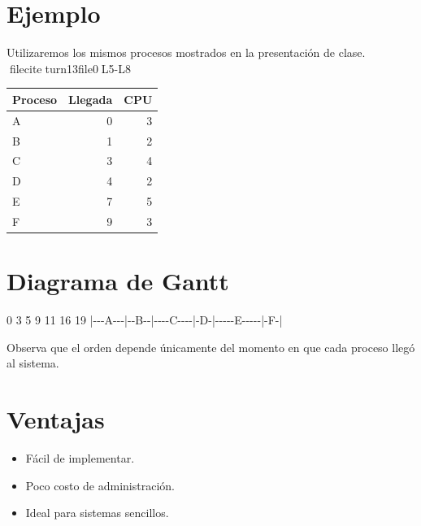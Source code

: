 \documentclass[
  spanish,
  letterpaper,
]{scrbook}
\newenvironment{Shaded}{\begin{snugshade}}{\end{snugshade}}
\newcommand{\NormalTok}[1]{\textcolor[rgb]{0.00,0.23,0.31}{#1}}
\newcounter{none} %
\providecommand{\tightlist}{%
  \setlength{\itemsep}{0pt}\setlength{\parskip}{0pt}}
\begin{document}

\chapter{Ejemplo}\label{ejemplo-1}

Utilizaremos los mismos procesos mostrados en la presentación de clase.
fileciteturn13file0L5-L8

{\def\LTcaptype{none} %
\begin{longtable}[]{@{}lrr@{}}
\toprule\noalign{}
Proceso & Llegada & CPU \\
\midrule\noalign{}
\endhead
\bottomrule\noalign{}
\endlastfoot
A & 0 & 3 \\
B & 1 & 2 \\
C & 3 & 4 \\
D & 4 & 2 \\
E & 7 & 5 \\
F & 9 & 3 \\
\end{longtable}
}


\chapter{Diagrama de Gantt}\label{diagrama-de-gantt}

\begin{Shaded}
\begin{Highlighting}[]
\NormalTok{0      3    5        9   11        16   19}
\NormalTok{|{-}{-}{-}A{-}{-}{-}|{-}{-}B{-}{-}|{-}{-}{-}{-}C{-}{-}{-}{-}|{-}D{-}|{-}{-}{-}{-}{-}E{-}{-}{-}{-}{-}|{-}F{-}|}
\end{Highlighting}
\end{Shaded}

Observa que el orden depende únicamente del momento en que cada proceso
llegó al sistema.


\chapter{Ventajas}\label{ventajas-3}

\begin{itemize}
\tightlist
\item
  Fácil de implementar.
\item
  Poco costo de administración.
\item
  Ideal para sistemas sencillos.
\end{itemize}
\end{document}
